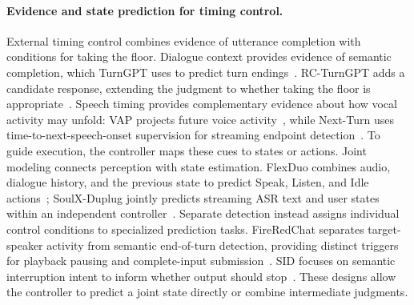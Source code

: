 \paragraph{Evidence and state prediction for timing control.}
External timing control combines evidence of utterance completion with conditions for taking the floor. Dialogue context provides evidence of semantic completion, which TurnGPT uses to predict turn endings~\citep{DBLP:journals/corr/abs-2010-10874}. RC-TurnGPT adds a candidate response, extending the judgment to whether taking the floor is appropriate~\citep{DBLP:conf/acl/JiangES23}. Speech timing provides complementary evidence about how vocal activity may unfold: VAP projects future voice activity~\citep{DBLP:conf/interspeech/EkstedtS22}, while Next-Turn uses time-to-next-speech-onset supervision for streaming endpoint detection~\citep{DBLP:journals/corr/abs-2606-18094}. To guide execution, the controller maps these cues to states or actions. Joint modeling connects perception with state estimation. FlexDuo combines audio, dialogue history, and the previous state to predict Speak, Listen, and Idle actions~\citep{DBLP:journals/corr/abs-2502-13472}; SoulX-Duplug jointly predicts streaming ASR text and user states within an independent controller~\citep{arXiv:2603.14877}. Separate detection instead assigns individual control conditions to specialized prediction tasks. FireRedChat separates target-speaker activity from semantic end-of-turn detection, providing distinct triggers for playback pausing and complete-input submission~\citep{DBLP:journals/corr/abs-2509-06502}. SID focuses on semantic interruption intent to inform whether output should stop~\citep{DBLP:journals/corr/abs-2603-24144}. These designs allow the controller to predict a joint state directly or combine intermediate judgments.

